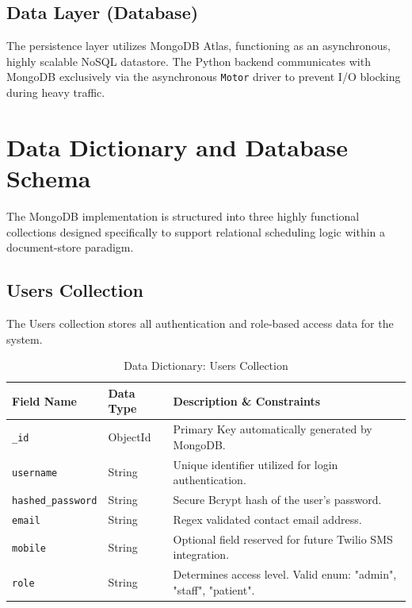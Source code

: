 \documentclass[12pt,a4paper]{report}
\begin{document}
\subsection{Data Layer (Database)}
The persistence layer utilizes MongoDB Atlas, functioning as an asynchronous, highly scalable NoSQL datastore. The Python backend communicates with MongoDB exclusively via the asynchronous \texttt{Motor} driver to prevent I/O blocking during heavy traffic.

\section{Data Dictionary and Database Schema}
The MongoDB implementation is structured into three highly functional collections designed specifically to support relational scheduling logic within a document-store paradigm.

\subsection{Users Collection}
The Users collection stores all authentication and role-based access data for the system.
\begin{table}[H]
\centering
\caption{Data Dictionary: Users Collection}
\begin{tabularx}{\textwidth}{|l|l|X|}
\hline
\textbf{Field Name} & \textbf{Data Type} & \textbf{Description \& Constraints} \\ \hline
\texttt{\_id} & ObjectId & Primary Key automatically generated by MongoDB. \\ \hline
\texttt{username} & String & Unique identifier utilized for login authentication. \\ \hline
\texttt{hashed\_password} & String & Secure Bcrypt hash of the user's password. \\ \hline
\texttt{email} & String & Regex validated contact email address. \\ \hline
\texttt{mobile} & String & Optional field reserved for future Twilio SMS integration. \\ \hline
\texttt{role} & String & Determines access level. Valid enum: "admin", "staff", "patient". \\ \hline
\end{tabularx}
\end{table}
\end{document}
